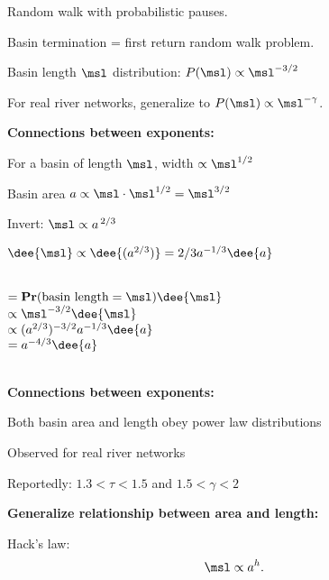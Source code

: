     Random walk with probabilistic pauses.
   
    Basin termination = first return random walk problem.
   
    Basin length $\msl$ distribution: $P(\msl) \propto \msl^{-3/2}$
   
    For real river networks, generalize 
    to $P(\msl) \propto \msl^{-\gamma}$.
  
  
  


  \textbf{Connections between exponents:}

  
  
     
    For a basin of length $\msl$, width $\propto \msl^{1/2}$
     
    Basin area $a \propto \msl\cdot \msl^{1/2} = \msl^{3/2}$
     
    Invert: $ \msl \propto a^{\, 2/3} $
     
    $ \dee{\msl} \propto \dee{(a^{2/3})} = 2/3 a^{-1/3} \dee{a} $
    
    \\
    $
    =
    \mathbf{Pr}(\mbox{basin length} = \msl) \dee{\msl}
    $\\
    {
      $
      \propto
      \msl^{-3/2} \dee{\msl} 
      $\\}
    {
      $
      \propto
      (a^{2/3})^{-3/2} a^{-1/3} \dee{a} 
      $\\}
    {
      $
      =
      a^{-4/3} \dee{a} 
      $\\}
    {
      \\}
  
  


  \textbf{Connections between exponents:}

  
  
   
    Both basin area and length obey power law distributions
   
    Observed for real river networks
   
    Reportedly: $1.3 < \tau < 1.5$ and $1.5 < \gamma < 2$
  
  

  \textbf{Generalize relationship between area and length:}
  
   
    Hack's law\cite{hack1957a}:
    $$\msl \propto a^h.$$
   
